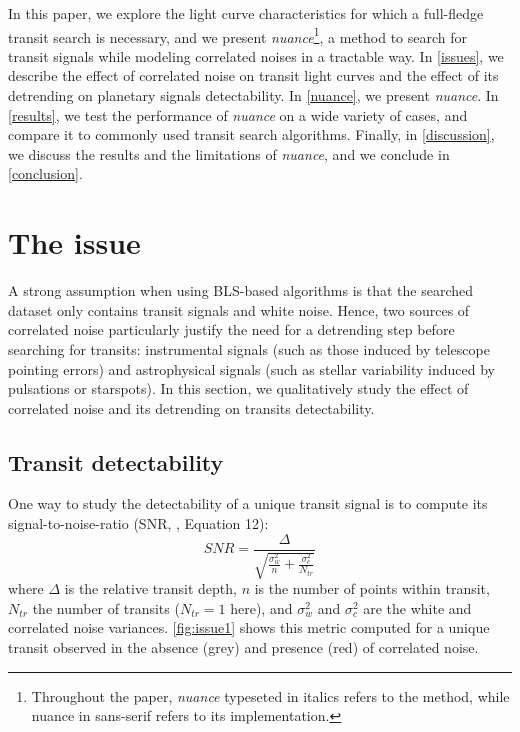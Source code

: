 \documentclass[modern]{aastex631}
\newcommand{\nuancemethod}{\textit{nuance}}
\newcommand{\nuance}{\nuancemethod{}}
\newcommand{\nuancecode}{\textsf{nuance}}
\begin{document}
In this paper, we explore the light curve characteristics for which a full-fledge transit search is necessary, and we present \nuancemethod{}\footnote{Throughout the paper, \nuancemethod{} typeseted in italics refers to the method, while \nuancecode{} in sans-serif refers to its implementation.}, a method to search for transit signals while modeling correlated noises in a tractable way. In \autoref{issues}, we describe the effect of correlated noise on transit light curves and the effect of its detrending on planetary signals detectability. In \autoref{nuance}, we present \nuance{}. In \autoref{results}, we test the performance of \nuance{} on a wide variety of cases, and compare it to commonly used transit search algorithms. Finally, in \autoref{discussion}, we discuss the results and the limitations of \nuance{}, and we conclude in \autoref{conclusion}.

\newpage
\section{The issue}\label{issues}

A strong assumption when using BLS-based algorithms is that the searched dataset only contains transit signals and white noise. Hence, two sources of correlated noise particularly justify the need for a detrending step before searching for transits: instrumental signals (such as those induced by telescope pointing errors) and astrophysical signals (such as stellar variability induced by pulsations or starspots). In this section, we qualitatively study the effect of correlated noise and its detrending on transits detectability.

\subsection{Transit detectability}

One way to study the detectability of a unique transit signal is to compute its signal-to-noise-ratio (SNR, \citealt{Pont2006}, Equation 12):
\begin{equation}\label{eq:snr}
  SNR= \frac{\Delta}{\sqrt{\frac{\sigma_w^2}{n} + \frac{\sigma_c^2}{N_{tr}}}}
\end{equation}
where $\Delta$ is the relative transit depth, $n$ is the number of points within transit, $N_{tr}$ the number of transits ($N_{tr}=1$ here), and $\sigma_w^2$ and $\sigma_c^2$ are the white and correlated noise variances. \autoref{fig:issue1} shows this metric computed for a unique transit observed in the absence (grey) and presence (red) of correlated noise.
\end{document}
